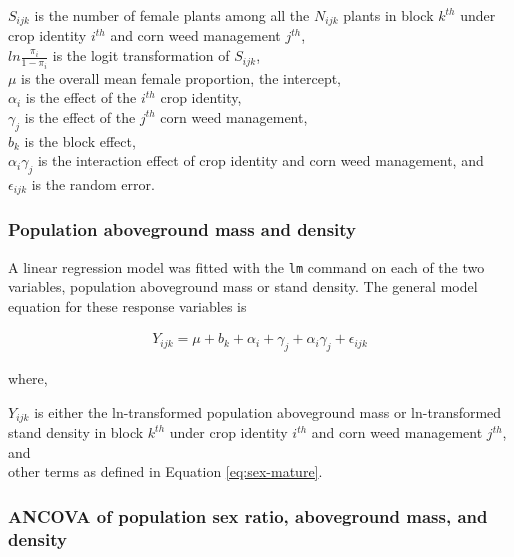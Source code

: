 \documentclass[
]{article}
\begin{document}
\(S_{ijk}\) is the number of female plants among all the \(N_{ijk}\) plants in block \(k^{th}\) under crop identity \(i^{th}\) and corn weed management \(j^{th}\),\\
\(ln \frac{\pi_i}{1-\pi_i}\) is the logit transformation of \(S_{ijk}\),\\
\(\mu\) is the overall mean female proportion, the intercept,\\
\(\alpha_i\) is the effect of the \(i^{th}\) crop identity,\\
\(\gamma_j\) is the effect of the \(j^{th}\) corn weed management,\\
\(b_k\) is the block effect,\\
\(\alpha_i \gamma_j\) is the interaction effect of crop identity and corn weed management, and\\
\(\epsilon_{ijk}\) is the random error.

\hypertarget{population-aboveground-mass-and-density-1}{%
\subsubsection*{Population aboveground mass and density}\label{population-aboveground-mass-and-density-1}}

A linear regression model was fitted with the \texttt{lm} command on each of the two variables, population aboveground mass or stand density. The general model equation for these response variables is

\begin{align}
Y_{ijk} = \mu + b_k + \alpha_i + \gamma_j +\alpha_i \gamma_j + \epsilon_{ijk} \label{eq:pop-mass-dens}
\end{align}

where,

\(Y_{ijk}\) is either the ln-transformed population aboveground mass or ln-transformed stand density in block \(k^{th}\) under crop identity \(i^{th}\) and corn weed management \(j^{th}\), and\\
other terms as defined in Equation \eqref{eq:sex-mature}.

\hypertarget{ancova-of-population-sex-ratio-aboveground-mass-and-density}{%
\subsubsection*{ANCOVA of population sex ratio, aboveground mass, and density}\label{ancova-of-population-sex-ratio-aboveground-mass-and-density}}
\end{document}
